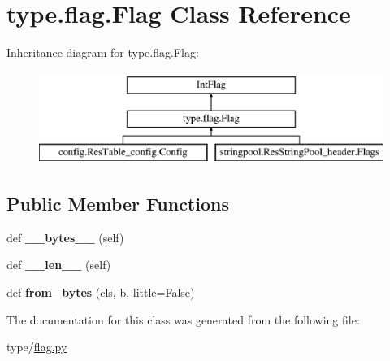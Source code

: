 \hypertarget{classtype_1_1flag_1_1Flag}{}\section{type.\+flag.\+Flag Class Reference}
\label{classtype_1_1flag_1_1Flag}
Inheritance diagram for type.\+flag.\+Flag\+:\begin{figure}[H]
\begin{center}
\leavevmode
\includegraphics[height=3.000000cm]{classtype_1_1flag_1_1Flag}
\end{center}
\end{figure}
\subsection*{Public Member Functions}
\begin{DoxyCompactItemize}
\item 
\mbox{\label{classtype_1_1flag_1_1Flag_a28d882c36e0629a46156cc452ac62e00}} 
def {\bfseries \+\_\+\+\_\+bytes\+\_\+\+\_\+} (self)
\item 
\mbox{\label{classtype_1_1flag_1_1Flag_a40f53430fcad890ead17a6a20ce85196}} 
def {\bfseries \+\_\+\+\_\+len\+\_\+\+\_\+} (self)
\item 
\mbox{\label{classtype_1_1flag_1_1Flag_a97fc15bc119f4b43b41f6eb97d07a3a6}} 
def {\bfseries from\+\_\+bytes} (cls, b, little=False)
\end{DoxyCompactItemize}


The documentation for this class was generated from the following file\+:\begin{DoxyCompactItemize}
\item 
type/\mbox{\hyperlink{flag_8py}{flag.\+py}}\end{DoxyCompactItemize}

